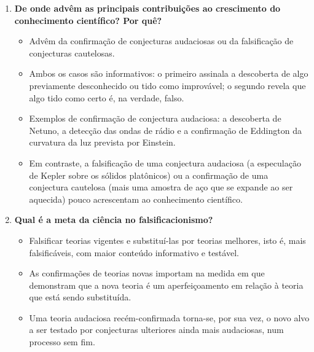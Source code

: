 \documentclass[10pt,a4paper]{extarticle}
\begin{document}
\begin{enumerate}[resume, label=\textbf{\arabic*.}, itemsep=10pt]
\item \textbf{De onde advêm as principais contribuições ao crescimento do conhecimento científico? Por quê?}
\begin{itemize}
  \item Advêm da confirmação de conjecturas audaciosas ou da falsificação de conjecturas cautelosas.
  \item Ambos os casos são informativos: o primeiro assinala a descoberta de algo previamente desconhecido ou tido como improvável; o segundo revela que algo tido como certo é, na verdade, falso.
  \item Exemplos de confirmação de conjectura audaciosa: a descoberta de Netuno, a detecção das ondas de rádio e a confirmação de Eddington da curvatura da luz prevista por Einstein.
  \item Em contraste, a falsificação de uma conjectura audaciosa (a especulação de Kepler sobre os sólidos platônicos) ou a confirmação de uma conjectura cautelosa (mais uma amostra de aço que se expande ao ser aquecida) pouco acrescentam ao conhecimento científico.
\end{itemize}

\item \textbf{Qual é a meta da ciência no falsificacionismo?}
\begin{itemize}
  \item Falsificar teorias vigentes e substituí-las por teorias melhores, isto é, mais falsificáveis, com maior conteúdo informativo e testável.
  \item As confirmações de teorias novas importam na medida em que demonstram que a nova teoria é um aperfeiçoamento em relação à teoria que está sendo substituída.
  \item Uma teoria audaciosa recém-confirmada torna-se, por sua vez, o novo alvo a ser testado por conjecturas ulteriores ainda mais audaciosas, num processo sem fim.
\end{itemize}


\end{enumerate}
\end{document}
